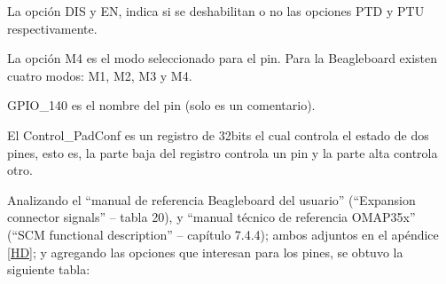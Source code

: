 La opción DIS y EN, indica si se deshabilitan o no las opciones PTD y PTU respectivamente. 

La opción M4 es el modo seleccionado para el pin. Para la Beagleboard existen cuatro modos: M1, M2, M3 y M4.

\bigskip
GPIO\_140 es el nombre del pin (solo es un comentario). 

\bigskip
El Control\_PadConf es un registro de 32bits el cual controla el estado de dos pines, esto es, la parte 
baja del registro controla un pin y la parte alta controla otro. 

Analizando el “manual de referencia Beagleboard del usuario” (“Expansion connector signals” – tabla 20), y “manual técnico de referencia OMAP35x” (“SCM functional description” – capítulo 7.4.4); ambos adjuntos en el apéndice \ref{HD}; y agregando las opciones que interesan para los pines, se obtuvo la siguiente tabla: 

